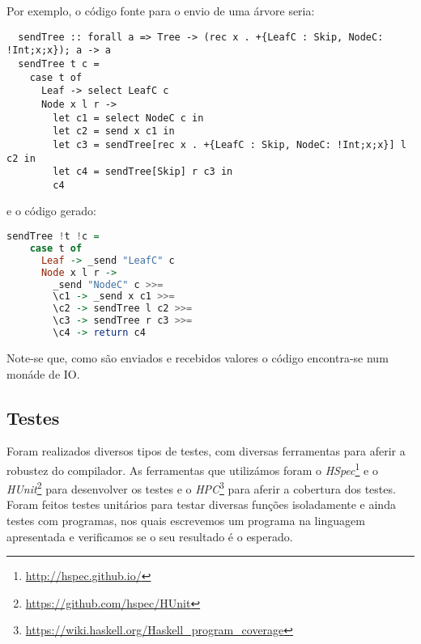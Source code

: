 \begin{itemize}
%  
%  
Por exemplo, o código fonte para o envio de uma árvore seria:

\begin{lstlisting}
  sendTree :: forall a => Tree -> (rec x . +{LeafC : Skip, NodeC: !Int;x;x}); a -> a
  sendTree t c =
    case t of
      Leaf -> select LeafC c
      Node x l r ->
        let c1 = select NodeC c in
        let c2 = send x c1 in
        let c3 = sendTree[rec x . +{LeafC : Skip, NodeC: !Int;x;x}] l c2 in
        let c4 = sendTree[Skip] r c3 in
        c4
\end{lstlisting}

e o código gerado:
\begin{lstlisting}[language=Haskell]
  sendTree !t !c =
    case t of 
      Leaf -> _send "LeafC" c 
      Node x l r ->
        _send "NodeC" c >>=
        \c1 -> _send x c1 >>=
        \c2 -> sendTree l c2 >>=
        \c3 -> sendTree r c3 >>=
        \c4 -> return c4 
\end{lstlisting}

Note-se que, como são enviados e recebidos valores o código encontra-se num monáde de IO. 

\end{itemize}

\subsection{Testes}

Foram realizados diversos tipos de testes, com diversas ferramentas para aferir a robustez do compilador. As ferramentas que utilizámos foram o \textit{HSpec}\footnote{\url{http://hspec.github.io/}} e o \textit{HUnit}\footnote{\url{https://github.com/hspec/HUnit}} para desenvolver os testes e o \textit{HPC}\footnote{\url{https://wiki.haskell.org/Haskell_program_coverage}} para aferir a cobertura dos testes. Foram feitos testes unitários para testar diversas funções isoladamente e ainda testes com programas, nos quais escrevemos um programa na linguagem apresentada e verificamos se o seu resultado é o esperado.

